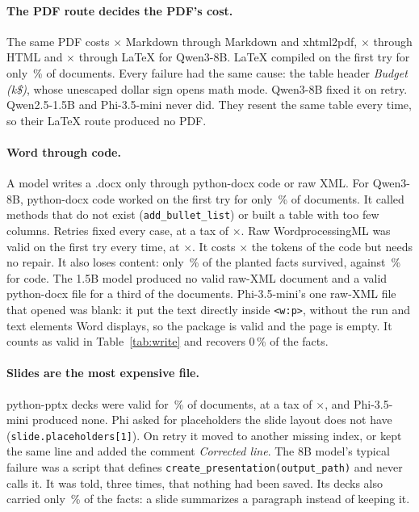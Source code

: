 \paragraph{The PDF route decides the PDF's cost.} The same PDF costs
\TaxPdfViaMd$\times$ Markdown through Markdown and xhtml2pdf,
\TaxPdfViaHtml$\times$ through HTML and \TaxPdfViaTex$\times$ through
LaTeX for Qwen3-8B. LaTeX compiled on the first try for only
\FirstValidTex\,\% of documents. Every failure had the same cause: the
table header \emph{Budget (k\$)}, whose unescaped dollar sign opens math
mode. Qwen3-8B
fixed it on retry. Qwen2.5-1.5B and Phi-3.5-mini never did. They resent
the same table every time, so their LaTeX route produced no PDF.

\paragraph{Word through code.} A model writes a .docx only through
python-docx code or raw XML. For Qwen3-8B, python-docx code worked on the
first try for only \FirstValidDocxCode\,\% of documents. It called methods
that do not exist (\texttt{add\_bullet\_list}) or built a table with too
few columns. Retries fixed every case, at a tax of
\TaxDocxCode$\times$. Raw WordprocessingML was valid on the first try every
time, at \TaxDocxXml$\times$. It costs \DocxXmlOverCodeTokens$\times$ the
tokens of the code but needs no repair. It also loses content: only
\RecallDocxXml\,\% of the planted facts survived, against
\RecallDocxCode\,\% for code. The 1.5B model produced no valid raw-XML
document and a valid python-docx file for a third of the documents.
Phi-3.5-mini's one raw-XML file that opened was blank: it put the text
directly inside \texttt{<w:p>}, without the run and text elements Word
displays, so the package is valid and the page is empty. It counts as
valid in Table~\ref{tab:write} and recovers 0\,\% of the facts.

\paragraph{Slides are the most expensive file.} python-pptx decks were
valid for \ValidPptxCode\,\% of documents, at a tax of
\TaxPptxCode$\times$, and Phi-3.5-mini produced none. Phi asked for
placeholders the slide layout does not have
(\texttt{slide.placeholders[1]}). On retry it moved to another missing
index, or kept the same line and added the comment \emph{Corrected line}. The 8B model's typical failure was a script that
defines \texttt{create\_presentation(output\_path)} and never calls it. It
was told, three times, that nothing had been saved. Its decks also carried
only \RecallPptxCode\,\% of the facts: a slide summarizes a paragraph
instead of keeping it.

